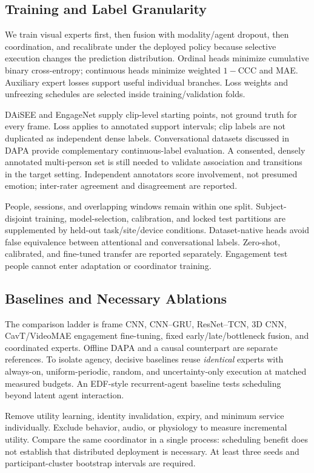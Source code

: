 \documentclass[a4paper,conference]{IEEEtran}
\begin{document}
\subsection{Training and Label Granularity}
We train visual experts first, then fusion with modality/agent dropout, then coordination, and recalibrate under the deployed policy because selective execution changes the prediction distribution. Ordinal heads minimize cumulative binary cross-entropy; continuous heads minimize weighted $1-\mathrm{CCC}$ and MAE. Auxiliary expert losses support useful individual branches. Loss weights and unfreezing schedules are selected inside training/validation folds.

DAiSEE and EngageNet supply clip-level starting points, not ground truth for every frame. Loss applies to annotated support intervals; clip labels are not duplicated as independent dense labels. Conversational datasets discussed in DAPA provide complementary continuous-label evaluation. A consented, densely annotated multi-person set is still needed to validate association and transitions in the target setting. Independent annotators score involvement, not presumed emotion; inter-rater agreement and disagreement are reported.

People, sessions, and overlapping windows remain within one split. Subject-disjoint training, model-selection, calibration, and locked test partitions are supplemented by held-out task/site/device conditions. Dataset-native heads avoid false equivalence between attentional and conversational labels. Zero-shot, calibrated, and fine-tuned transfer are reported separately. Engagement test people cannot enter adaptation or coordinator training.

\subsection{Baselines and Necessary Ablations}
The comparison ladder is frame CNN, CNN--GRU, ResNet--TCN, 3D CNN, CavT/VideoMAE engagement fine-tuning, fixed early/late/bottleneck fusion, and coordinated experts. Offline DAPA and a causal counterpart are separate references. To isolate agency, decisive baselines reuse \emph{identical} experts with always-on, uniform-periodic, random, and uncertainty-only execution at matched measured budgets. An EDF-style recurrent-agent baseline tests scheduling beyond latent agent interaction.

Remove utility learning, identity invalidation, expiry, and minimum service individually. Exclude behavior, audio, or physiology to measure incremental utility. Compare the same coordinator in a single process: scheduling benefit does not establish that distributed deployment is necessary. At least three seeds and participant-cluster bootstrap intervals are required.
\end{document}
